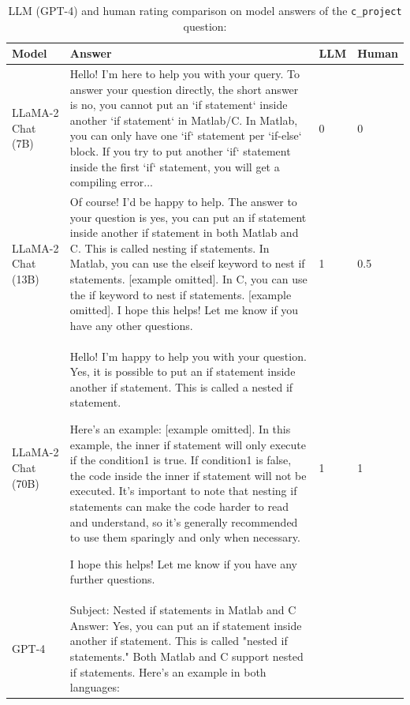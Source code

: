 \begin{table}[!ht]
\caption{LLM (GPT-4) and human rating comparison on model answers of the \texttt{c\_project} question: }
\label{tab:models}
\footnotesize
\begin{tabular}{p{} p{} p{} p{}}
\toprule
\textbf{Model} & \textbf{Answer} & \textbf{LLM} & \textbf{Human} \\
\midrule 
LLaMA-2 Chat (7B) & 
Hello! I'm here to help you with your query.
To answer your question directly, the short answer is no, you cannot put an `if statement` inside another `if statement` in Matlab/C.
In Matlab, you can only have one `if` statement per `if-else` block. 
If you try to put another `if` statement inside the first `if` statement, you will get a compiling error...
& 0 & 0 \\
\midrule
LLaMA-2 Chat (13B) & 
Of course! I'd be happy to help. 
The answer to your question is yes, you can put an if statement inside another if statement in both Matlab and C. This is called nesting if statements.
In Matlab, you can use the elseif keyword to nest if statements. [example omitted]. 
In C, you can use the if keyword to nest if statements. [example omitted].
I hope this helps! Let me know if you have any other questions.
& 1 & 0.5 \\
\midrule 
LLaMA-2 Chat (70B) & 
Hello! I'm happy to help you with your question. Yes, it is possible to put an if statement inside another if statement. This is called a nested if statement.

Here's an example: [example omitted]. 
In this example, the inner if statement will only execute if the condition1 is true. If condition1 is false, the code inside the inner if statement will not be executed.
It's important to note that nesting if statements can make the code harder to read and understand, so it's generally recommended to use them sparingly and only when necessary.

I hope this helps! Let me know if you have any further questions.
& 1 & 1 \\
\midrule
GPT-4 & 
Subject: Nested if statements in Matlab and C
Answer:
Yes, you can put an if statement inside another if statement. This is called "nested if statements." Both Matlab and C support nested if statements. Here's an example in both languages:


\end{tabular}
\end{table}
